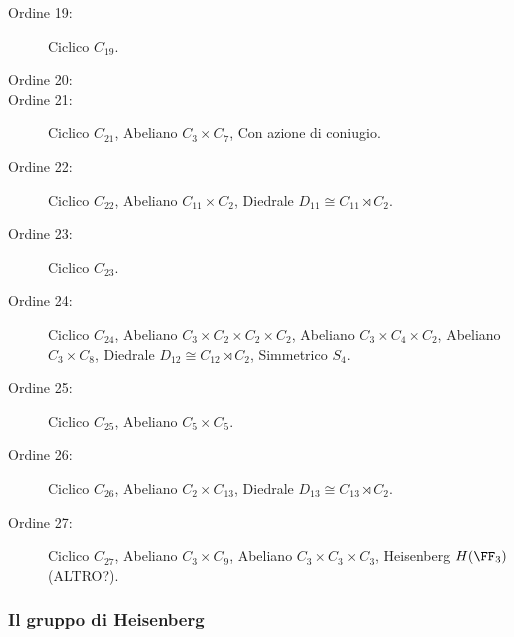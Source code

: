 \documentclass[11pt]{scrartcl}
\begin{document}
\begin{description}
		\item[Ordine 19:] Ciclico $C_{19}$.
		\item[Ordine 20:]
		\item[Ordine 21:] Ciclico $C_{21}$, Abeliano $C_3\times C_7$, Con azione di coniugio.
		\item[Ordine 22:] Ciclico $C_{22}$, Abeliano $C_{11}\times C_2$, Diedrale $D_{11}\cong C_{11}\rtimes C_2$.
		\item[Ordine 23:] Ciclico $C_{23}$.
		\item[Ordine 24:] Ciclico $C_{24}$, Abeliano $C_3\times C_2\times C_2\times C_2$, Abeliano $C_3\times C_4\times C_2$, Abeliano $C_3\times C_8$, Diedrale $D_{12}\cong C_{12}\rtimes C_2$, Simmetrico $S_{4}$. 
		\item[Ordine 25:] Ciclico $C_{25}$, Abeliano $C_{5}\times C_5$.
		\item[Ordine 26:] Ciclico $C_{26}$, Abeliano $C_2\times C_{13}$, Diedrale $D_{13}\cong C_{13}\rtimes C_2$.
		\item[Ordine 27:] Ciclico $C_{27}$, Abeliano $C_3\times C_9$, Abeliano $C_3\times C_3\times C_3$, Heisenberg $H(\FF_3)$ (ALTRO?).
	\end{description}
	
	\subsubsection{Il gruppo di Heisenberg}
	
\end{document}
